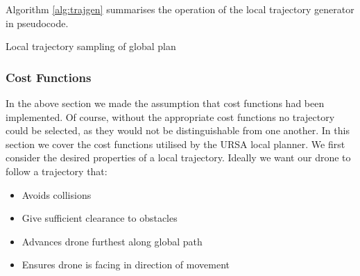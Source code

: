 \documentclass[capstone_report.tex]{subfiles}
\begin{document}
Algorithm \ref{alg:trajgen} summarises the operation of the local trajectory generator in pseudocode.\\
\begin{algorithm}[H]
\vspace{1.5mm}

\vspace{3.5mm}
\caption{Local trajectory sampling of global plan}
\label{alg:trajgen}
\end{algorithm}

\subsubsection{Cost Functions}

In the above section we made the assumption that cost functions had been implemented.  Of course, without the appropriate cost functions no trajectory could be selected, as they would not be distinguishable from one another.  In this section we cover the cost functions utilised by the URSA local planner.  We first consider the desired properties of a local trajectory.  Ideally we want our drone to follow a trajectory that:
\begin{itemize}
    \item Avoids collisions
    \item Give sufficient clearance to obstacles
    \item Advances drone furthest along global path
    \item Ensures drone is facing in direction of movement
\end{itemize}
\end{document}
